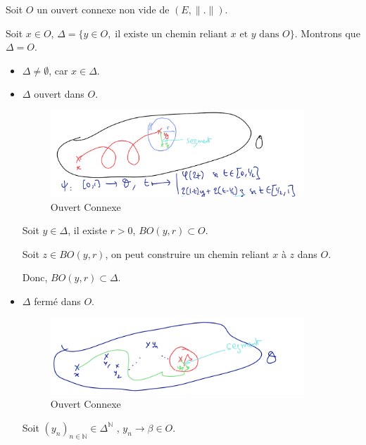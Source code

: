 \begin{myproof}{}{}

Soit $O$ un ouvert connexe non vide de $(E, \| . \|)$. 

Soit $x \in O$, $\Delta = \{ y \in O,\; \text{il existe un chemin reliant } x \text{ et } y \text{ dans }O\}$. Montrons que $\Delta = O$.
\begin{itemize}

    \item $\Delta \ne \emptyset$, car $x \in \Delta$. 
    \item $\Delta$ ouvert dans $O$. 
      \begin{figure}[H] %
        \centering
        \includegraphics[width=0.9\textwidth]{./assets/Ouvert-Connexe-Pr1.png}
        \caption{Ouvert Connexe}
      \end{figure}

      Soit $y \in \Delta$, il existe $r >0$, $BO(y, r) \subset O$.

      Soit $z \in BO(y,r)$, on peut construire un chemin reliant $x$ à $z$ dans $O$. 

      Donc, $BO(y,r) \subset \Delta$.

    \item $\Delta$  fermé dans $O$.
      \begin{figure}[H] %
        \centering
        \includegraphics[width=0.9\textwidth]{./assets/Ouvert-Connexe-Pr2.png}
        \caption{Ouvert Connexe}
        \label{fig:Ouvert Connexe}
      \end{figure}

      Soit $(y_n) _{n \in \mathbb{N}} \in \Delta ^{\mathbb{N}}$ , $y_n  \underset{}{\longrightarrow} \beta \in O$. 


\end{itemize}
\end{myproof}
